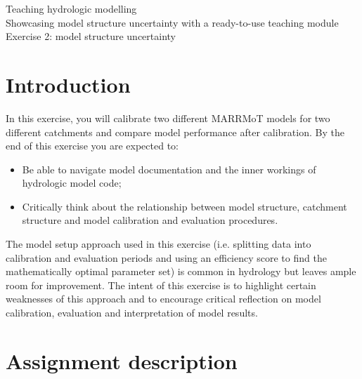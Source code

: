 \documentclass[12pt]{article}
\begin{document}

\begin{center}
Teaching hydrologic modelling\\
Showcasing model structure uncertainty with a ready-to-use teaching module \\
\vspace*{3mm}
Exercise 2: model structure uncertainty\\
\end{center}

\bigskip


\section{Introduction}

In this exercise, you will calibrate two different MARRMoT models for two different catchments and compare model performance after calibration. By the end of this exercise you are expected to:

\begin{itemize}
	\item Be able to navigate model documentation and the inner workings of hydrologic model code;
    \item Critically think about the relationship between model structure, catchment structure and model calibration and evaluation procedures.
\end{itemize}

\noindent
The model setup approach used in this exercise (i.e. splitting data into calibration and evaluation periods and using an efficiency score to find the mathematically optimal parameter set) is common in hydrology but leaves ample room for improvement. The intent of this exercise is to highlight certain weaknesses of this approach and to encourage critical reflection on model calibration, evaluation and interpretation of model results.


\section{Assignment description}
\end{document}

